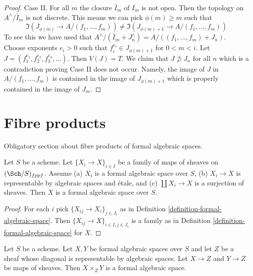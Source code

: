 \begin{proof}
\medskip\noindent
Case II. For all $m$ the closure $\bar I_m$ of $I_m$ is not open.
Then the topology on $A^\wedge/\bar I_m$ is not discrete. This means
we can pick $\phi(m) \geq m$ such that
$$
\Im(J_{\phi(m)} \to A/(f_1, \ldots, f_m)) \not =
\Im(J_{\phi(m) + 1} \to A/(f_1, \ldots, f_m))
$$
To see this we have used that
$A^\wedge/(\bar I_m + J_n^\wedge) = A/((f_1, \ldots, f_m) + J_n)$.
Choose exponents $e_i > 0$ such that $f_i^{e_i} \in J_{\phi(m) + 1}$
for $0 < m < i$. Let $J = (f_1^{e_1}, f_2^{e_2}, f_3^{e_3}, \ldots)$.
Then $V(J) = T$. We claim that $J \not \supset J_n$ for all $n$
which is a contradiction proving Case II does not occur.
Namely, the image of $J$ in $A/(f_1, \ldots, f_m)$ is contained
in the image of $J_{\phi(m) + 1}$ which is properly contained in the
image of $J_m$.
\end{proof}




\section{Fibre products}
\label{section-fibre-products}

\noindent
Obligatory section about fibre products of formal algebraic spaces.

\begin{lemma}
\label{lemma-etale-covering-by-formal-algebraic-spaces}
Let $S$ be a scheme. Let $\{X_i \to X\}_{i \in I}$ be a family of maps
of sheaves on $(\Sch/S)_{fppf}$. Assume (a) $X_i$ is a
formal algebraic space over $S$, (b) $X_i \to X$ is representable
by algebraic spaces and \'etale, and (c) $\coprod X_i \to X$
is a surjection of sheaves. Then $X$ is a formal algebraic space
over $S$.
\end{lemma}

\begin{proof}
For each $i$ pick $\{X_{ij} \to X_i\}_{j \in J_i}$ as in
Definition \ref{definition-formal-algebraic-space}.
Then $\{X_{ij} \to X\}_{i \in I, j \in J_i}$ is a family
as in Definition \ref{definition-formal-algebraic-space}
for $X$.
\end{proof}

\begin{lemma}
\label{lemma-fibre-products-general}
Let $S$ be a scheme. Let $X, Y$ be formal algebraic spaces over $S$
and let $Z$ be a sheaf whose diagonal is representable by
algebraic spaces. Let $X \to Z$ and $Y \to Z$ be maps of sheaves.
Then $X \times_Z Y$ is a formal algebraic space.
\end{lemma}

